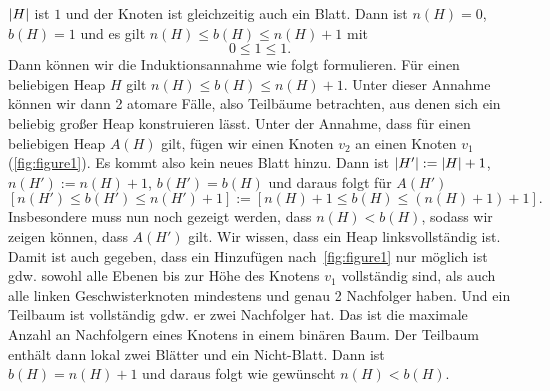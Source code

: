 \documentclass[10pt]{article}
\begin{document}
\begin{loesung}
\begin{enumerate}
\begin{beweis}
                \IB $\left|H\right|$ ist $1$ und der Knoten ist gleichzeitig auch ein Blatt.
                Dann ist $n(H) = 0$, $b(H) = 1$ und es gilt $n(H) \leq b(H) \leq n(H) + 1$ mit
                \[
                    0 \leq 1 \leq 1.
                \]
                Dann können wir die Induktionsannahme wie folgt formulieren.
                \IA Für einen beliebigen Heap $H$ gilt $n(H) \leq b(H) \leq n(H) + 1$.
                Unter dieser Annahme können wir dann 2 atomare Fälle, also Teilbäume betrachten, aus denen sich ein beliebig gro{\ss}er Heap konstruieren lässt.
                \IS[1] Unter der Annahme, dass für einen beliebigen Heap $A(H)$ gilt, fügen wir einen Knoten $v_2$ an einen Knoten $v_1$ (\autoref{fig:figure1}).
                Es kommt also kein neues Blatt hinzu.
                Dann ist $\left|H'\right| := \left|H\right| + 1$, $n(H') := n(H) + 1$, $b(H') = b(H)$ und daraus folgt für $A(H')$
                \[
                    [n(H') \leq b(H') \leq n(H') + 1] := [n(H) + 1 \leq b(H) \leq (n(H) + 1) + 1].
                \]
                Insbesondere muss nun noch gezeigt werden, dass $n(H) < b(H)$, sodass wir zeigen können, dass $A(H')$ gilt.
                Wir wissen, dass ein Heap linksvollständig ist.
                Damit ist auch gegeben, dass ein Hinzufügen nach~\autoref{fig:figure1} nur möglich ist gdw. sowohl alle Ebenen bis zur Höhe des Knotens $v_1$ vollständig sind, als auch alle linken Geschwisterknoten mindestens und genau 2 Nachfolger haben.
                Und ein Teilbaum ist vollständig gdw. er zwei Nachfolger hat.
                Das ist die maximale Anzahl an Nachfolgern eines Knotens in einem binären Baum.
                Der Teilbaum enthält dann lokal zwei Blätter und ein Nicht-Blatt.
                Dann ist $b(H) = n(H) + 1$ und daraus folgt wie gewünscht $n(H) < b(H)$.


\end{beweis}
\end{enumerate}
\end{loesung}
\end{document}
